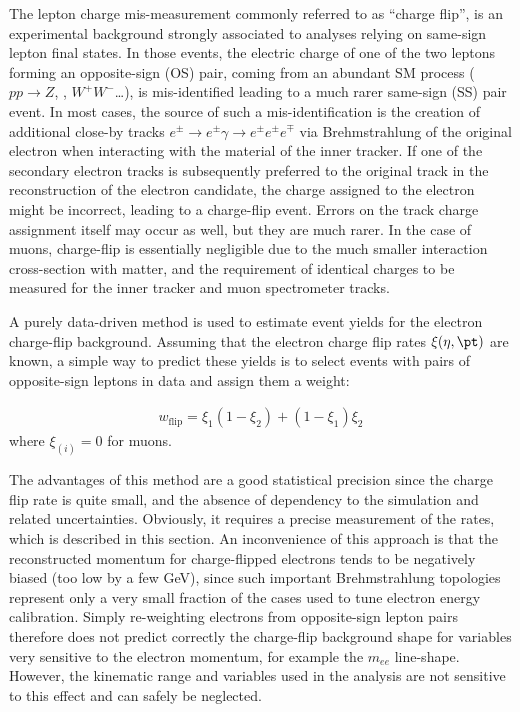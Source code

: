 The lepton charge mis-measurement commonly referred to as ``charge flip'', 
is an experimental background strongly associated to analyses relying on same-sign lepton final states. 
In those events, the electric charge of one of the two leptons forming an opposite-sign (OS) pair, 
coming from an abundant SM process ($pp\to Z$, \ttbar, $W^+W^-$\ldots), 
is mis-identified leading to a much rarer same-sign (SS) pair event.
In most cases, the source of such a mis-identification 
is the creation of additional close-by tracks $e^\pm\to e^\pm\gamma\to e^\pm e^\pm e^\mp$ 
via Brehmstrahlung of the original electron when interacting with the material of the inner tracker. 
If one of the secondary electron tracks is subsequently preferred to the original track in the reconstruction of the electron candidate, 
the charge assigned to the electron might be incorrect, leading to a charge-flip event. 
Errors on the track charge assignment itself may occur as well, but they are much rarer. 
In the case of muons, charge-flip is essentially negligible due to the much smaller interaction cross-section with matter, 
and the requirement of identical charges to be measured for the inner tracker and muon spectrometer tracks. 

A purely data-driven method is used to estimate event yields for the 
electron charge-flip background. 
Assuming that the electron charge flip rates $\xi(\eta,\pt)$ are known, 
a simple way to predict these yields is to select events with pairs of opposite-sign leptons in data and assign them a weight:

\begin{align}
w_\text{flip} = \xi_1(1-\xi_2) + (1-\xi_1)\xi_2
\label{eqn:chargeflip_weight}
\end{align}
where $\xi_{(i)}=0$ for muons.

The advantages of this method are a good statistical precision since the charge flip rate is quite small, 
and the absence of dependency to the simulation and related uncertainties. 
Obviously, it requires a precise measurement of the rates, which is described in this section. 
An inconvenience of this approach is that the reconstructed momentum for charge-flipped electrons  
tends to be negatively biased (too low by a few GeV), 
since such important Brehmstrahlung topologies represent only 
a very small fraction of the cases used to tune electron energy calibration. 
Simply re-weighting electrons from opposite-sign lepton pairs therefore does not predict correctly 
the charge-flip background shape for variables very sensitive to the electron momentum, for example the $m_{ee}$ line-shape. 
However, the kinematic range and variables used in the analysis are not
sensitive to this effect and can safely be neglected.

